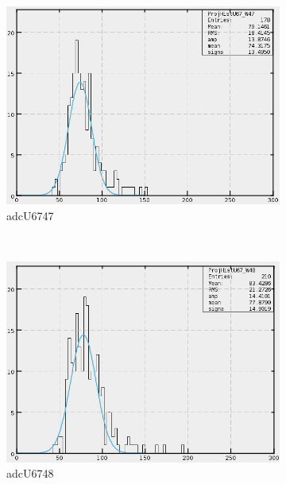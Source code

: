 \begin{figure}[h]
\begin{subfigure}[h]{0.3\textwidth}
        \includegraphics[width=\textwidth, keepaspectratio = true]{adcU67_47}
        \caption{adcU6747}
        \label{fig:adcU67_47}
    \end{subfigure}
    ~
    \begin{subfigure}[h]{0.3\textwidth}
        \centering
        \includegraphics[width=\textwidth, keepaspectratio = true]{adcU67_48}
        \caption{adcU6748}
        \label{fig:adcU67_48}
    \end{subfigure}
    ~
    \begin{subfigure}[h]{0.3\textwidth}
        \centering

\end{subfigure}
\end{figure}
